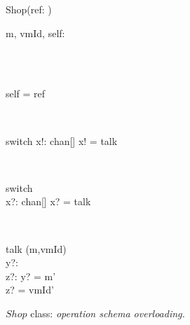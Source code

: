 \begin{figure}[H]
\centering
\begin{class}{Shop(ref: \integer)}
\\
\begin{state}
m, vmId, self: \integer
\end{state} 
\\
\begin{init}
\\self = ref
\end{init} 
\\
\begin{op}{switch}
x!: chan[\integer \times \integer]
\ST
x! = talk
\end{op}
\\
\begin{op}{switch}
\\x?: chan[\integer \times \integer]
\ST
x? = talk
\end{op}
\\
\begin{op}{talk}
\Delta (m,vmId)
\\y?: \integer
\\z?: \integer
\ST
y? = m'
\\z? = vmId'
\end{op}
\end{class}
\caption{$Shop$ class: \textit{operation schema overloading.}}
\label{fig_oz_overloaded_operation_shop}
\end{figure}